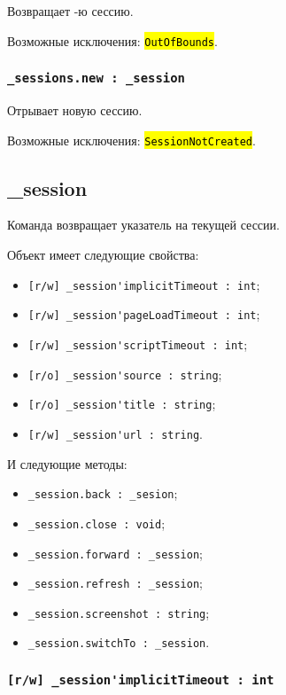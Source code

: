 \documentclass[a4paper, 14pt]{extarticle}
\newcommand{\ferror}[1]{\foreignlanguage{english}{\fontsize{11pt}{12pt}\tt{\sethlcolor{yellow}\hl{#1}}}}
\newenvironment{icItems}
	{ \begin{itemize} [noitemsep,nolistsep] }
	{ \end{itemize} }
\begin{document}
Возвращает -ю сессию.

Возможные исключения: \ferror{OutOfBounds}.

\subsubsection{\lstinline|_sessions.new : _session|}

Отрывает новую сессию.

Возможные исключения: \ferror{SessionNotCreated}.

\subsection{{\color{orange} \_session}}

Команда \session{} возвращает указатель на текущей сессии.

Объект \session{} имеет следующие свойства:
\begin{icItems}
	\item \lstinline|[r/w] _session'implicitTimeout : int|;
	\item \lstinline|[r/w] _session'pageLoadTimeout : int|;
	\item \lstinline|[r/w] _session'scriptTimeout : int|;
	\item \lstinline|[r/o] _session'source : string|;
	\item \lstinline|[r/o] _session'title : string|;
	\item \lstinline|[r/w] _session'url : string|.
\end{icItems}

И следующие методы:
\begin{icItems}
	\item \lstinline|_session.back : _sesion|;
	\item \lstinline|_session.close : void|;
	\item \lstinline|_session.forward : _session|;
	\item \lstinline|_session.refresh : _session|;
	\item \lstinline|_session.screenshot : string|;
	\item \lstinline|_session.switchTo : _session|.
\end{icItems}

\subsubsection{\lstinline|[r/w] _session'implicitTimeout : int|}
\end{document}
